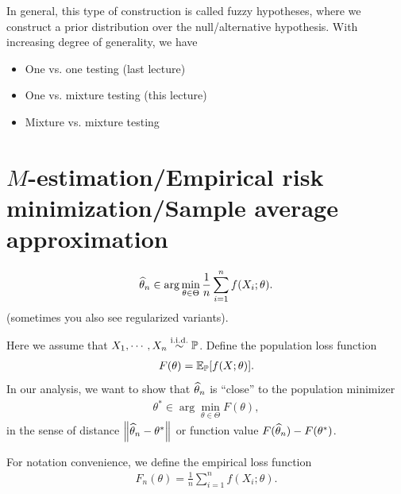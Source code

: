 \documentclass[11pt,letterpaper]{article}
\newcounter{lecture}
\numberwithin{theorem}{lecture}
\numberwithin{proposition}{lecture}
\numberwithin{lemma}{lecture}
\numberwithin{claim}{lecture}
\numberwithin{corollary}{lecture}
\numberwithin{definition}{lecture}
\numberwithin{conjecture}{lecture}
\numberwithin{remark}{lecture}
\numberwithin{example}{lecture}
\numberwithin{equation}{lecture}
\begin{document}
In general, this type of construction is called fuzzy hypotheses, where we construct a prior distribution over the null/alternative hypothesis. With increasing degree of generality, we have
\begin{itemize}
  \item One vs. one testing (last lecture)
  \item One vs. mixture testing (this lecture)
  \item Mixture vs. mixture testing
\end{itemize}

\section{$M$-estimation/Empirical risk minimization/Sample average approximation}
\begin{align*}
  \widehat{\theta}_n \in \arg\min_{\theta \in \Theta} \frac{1}{n} \sum_{i = 1}^n f (X_i; \theta).
\end{align*}
(sometimes you also see regularized variants).

Here we assume that $X_1, \cdots, X_n \overset{\mathrm{i.i.d.}}{\sim} {\mathbb{P}}$. Define the population loss function
\begin{align*}
  F (\theta) = {\mathbb{E}}_{{\mathbb{P}}} [f (X; \theta)].
\end{align*}
In our analysis, we want to show that $\widehat{\theta}_n$ is ``close'' to the population minimizer
\begin{align*}
  \theta^* \in \arg\min_{\theta \in \Theta} F (\theta),
\end{align*}
in the sense of distance $\left\| \widehat{\theta}_n - \theta^*\right\|_{}$ or function value $F (\widehat{\theta}_n) - F (\theta^*)$.

For notation convenience, we define the empirical loss function
\begin{align*}
  F_n (\theta) = \frac{1}{n} \sum_{i = 1}^n f (X_i; \theta).
\end{align*}
\end{document}
